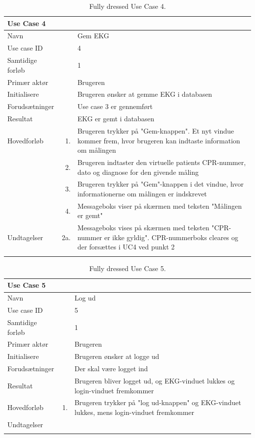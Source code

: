 \begin{longtabu} to  %
    {\large \textbf{Use Case 4}} && \\
    \toprule
    Navn &&    Gem EKG\\
    Use case ID &&    4\\
    Samtidige forløb &&    1\\
    Primær aktør &&    Brugeren\\
    Initialisere &&    Brugeren ønsker at gemme EKG i databasen\\
    Forudsætninger &&  Use case 3 er gennemført\\
    Resultat &&    EKG er gemt i databasen                    \\ \midrule
    Hovedforløb &    1. &    Brugeren trykker på "Gem-knappen". Et nyt vindue kommer frem, hvor brugeren kan indtaste information om målingen\\[-1ex]   						 	
                &    2. &	Brugeren indtaster den virtuelle patients CPR-nummer, dato og diagnose for den givende måling\\[-1ex]  
                
                &	3.	&	Brugeren trykker på "Gem"-knappen i det vindue, hvor informationerne om målingen er indskrevet\\[-1ex]	
                	              	
                &	4. &		Messageboks viser på skærmen med teksten "Målingen er gemt" \\ \midrule
                
    Undtagelser &    2a. & Messageboks vises på skærmen med teksten "CPR-nummer er ikke gyldig". CPR-nummerboks cleares og der forsættes i UC4 ved punkt 2     \\ \bottomrule
\caption{Fully dressed Use Case 4.}
\label{UC4}
\end{longtabu}

\begin{longtabu} to  %
    {\large \textbf{Use Case 5}} && \\
    \toprule
    Navn &&    Log ud\\
    Use case ID &&    5\\
    Samtidige forløb &&    1\\
    Primær aktør &&    Brugeren\\
    Initialisere &&    Brugeren ønsker at logge ud\\
    Forudsætninger &&  Der skal være logget ind\\
    Resultat &&    Brugeren bliver logget ud, og EKG-vinduet lukkes og login-vinduet fremkommer                     \\ \midrule
    Hovedforløb &    1. &    Brugeren trykker på "log ud-knappen" og EKG-vinduet lukkes, mens login-vinduet fremkommer 
    \\ \midrule
    Undtagelser & &
         \\ \bottomrule
\caption{Fully dressed Use Case 5.}
\label{UC5}
\end{longtabu}

